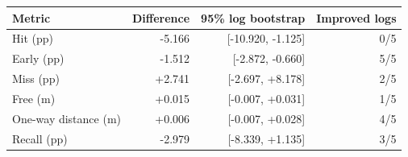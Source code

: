 \begin{tabular}{lrrr}
\toprule
Metric & Difference & 95\% log bootstrap & Improved logs \\
\midrule
Hit (pp) & -5.166 & [-10.920, -1.125] & 0/5 \\
Early (pp) & -1.512 & [-2.872, -0.660] & 5/5 \\
Miss (pp) & +2.741 & [-2.697, +8.178] & 2/5 \\
Free (m) & +0.015 & [-0.007, +0.031] & 1/5 \\
One-way distance (m) & +0.006 & [-0.007, +0.028] & 4/5 \\
Recall (pp) & -2.979 & [-8.339, +1.135] & 3/5 \\
\bottomrule
\end{tabular}
